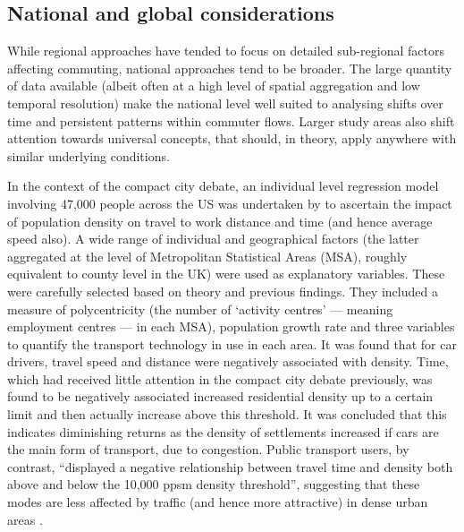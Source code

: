 \documentclass[a4paper, 11pt, twoside]{Thesis}
\begin{document}
\subsection{National and global considerations}
While regional approaches have tended to focus on detailed sub-regional factors
affecting commuting, national approaches tend to be broader. The large
quantity of data available (albeit often at a high level of spatial
aggregation and low temporal resolution) make the national level
well suited to analysing shifts over time and persistent patterns within commuter
flows. Larger study areas also shift attention towards universal concepts,
that should, in theory, apply anywhere with similar underlying conditions.

In the context of the compact city debate, an individual level regression
model involving 47,000 people across the US was undertaken by
\citet{Levtnson1997} to ascertain the impact of population density on
travel to work distance and time (and hence average speed also). A wide range
of individual and geographical
factors (the latter aggregated at the level of Metropolitan Statistical
Areas (MSA), roughly equivalent to county level in the UK) were
used as explanatory variables. These were
carefully selected based on theory and previous findings. They
included a measure of polycentricity (the number of `activity centres' --- meaning
employment centres --- in each MSA), population growth rate and three variables
to quantify the transport technology in use in each area. It was found that for
car drivers, travel speed and distance were negatively associated with density. Time,
which had received little attention in the compact city debate previously, was found to be
negatively associated  increased residential density up to a certain limit
and then actually increase above this threshold. It was concluded that
this indicates diminishing returns as the density of settlements increased 
if cars are the main form of transport, due to congestion. Public
transport users, by contrast, ``displayed a negative relationship between travel
time and density both above and below the 10,000 ppsm density threshold'',
suggesting that these modes are less affected by traffic (and hence more attractive)
in dense urban areas \citep[p.~168]{Levtnson1997}.
\end{document}
